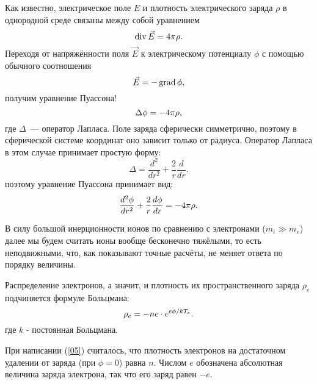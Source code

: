 Как известно, электрическое поле $E$ и плотность электрического заряда $\rho$ в однородной среде связаны между собой
уравнением
\begin{equation}
	\eqmark[01]
	\Div \vec{E}=4\pi\rho.
\end{equation}
Переходя от напряжённости поля $\vec{E}$ к электрическому потенциалу $\phi$ с помощью обычного соотношения
\begin{equation}
	\eqmark[02]
	\vec{E}=-\Grad\phi,
\end{equation}
получим уравнение Пуассона!
\begin{equation}
	\eqmark[03]
	\Delta\phi=-4\pi\rho,
\end{equation}
где $\Delta$~--- оператор Лапласа. Поле заряда сферически симметрично, поэтому в сферической системе координат оно зависит
только от радиуса. Оператор Лапласа в этом случае принимает простую форму:
\begin{equation*}
	\Delta=\frac{d^2}{dr^2}+\frac{2}{r}\frac{d}{dr}.
\end{equation*}
поэтому уравнение Пуассона принимает вид:
\begin{equation}
	\eqmark[04]
	\frac{d^2\phi}{dr^2}+\frac{2}{r}\frac{d\phi}{dr}=-4\pi\rho.
\end{equation}

В силу большой инерционности ионов по сравнению с электронами ($m_i\gg m_e$) далее мы будем считать ионы вообще бесконечно
тяжёлыми, то есть неподвижными, что, как показывают точные расчёты, не меняет ответа по порядку величины.

Распределение электронов, а значит, и плотность их пространственного заряда $\rho_e$ подчиняется формуле Больцмана:
\begin{equation}
	\eqmark[05]
	\rho_e=-ne\cdot e^{e\phi/kT_e}.
\end{equation}
где $k$ - постоянная Больцмана.

При написании (\eqref{05}) считалось, что плотность электронов на достаточном удалении от заряда (при $\phi=0$) равна $n$.
Числом $e$ обозначена абсолютная величина заряда электрона, так что его заряд равен $-e$.

